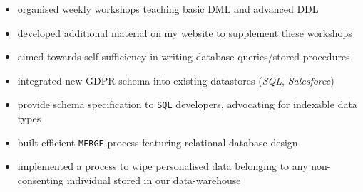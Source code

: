 \documentclass[../cv.tex]{subfiles}
\begin{document}
\begin{description}[style=multiline,leftmargin=3cm]
\begin{description}[style=multiline,leftmargin=3cm]
\begin{itemize}
			            \item organised weekly workshops teaching basic DML and advanced DDL
			            \item developed additional material on my website to supplement these workshops
			            \item aimed towards self-sufficiency in writing database queries/stored procedures
		            \end{itemize}
	      \end{description}
	\item[GDPR Pipeline \textnormal{Technical Lead}]
	      \begin{itemize}
		      \item integrated new GDPR schema into existing datastores (\textit{SQL}, \textit{Salesforce})
		      \item provide schema specification to \texttt{SQL} developers, advocating for indexable data types
		      \item built efficient \texttt{MERGE} process featuring relational database design
		      \item implemented a process to wipe personalised data belonging to any non-consenting individual stored in our data-warehouse
	      \end{itemize}
\end{description}
\end{document}
